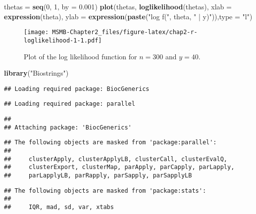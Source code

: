 \documentclass[]{article}
\newenvironment{Shaded}{\begin{snugshade}}{\end{snugshade}}
\newcommand{\KeywordTok}[1]{\textcolor[rgb]{0.13,0.29,0.53}{\textbf{#1}}}
\newcommand{\DataTypeTok}[1]{\textcolor[rgb]{0.13,0.29,0.53}{#1}}
\newcommand{\DecValTok}[1]{\textcolor[rgb]{0.00,0.00,0.81}{#1}}
\newcommand{\FloatTok}[1]{\textcolor[rgb]{0.00,0.00,0.81}{#1}}
\newcommand{\StringTok}[1]{\textcolor[rgb]{0.31,0.60,0.02}{#1}}
\newcommand{\NormalTok}[1]{#1}
\begin{document}
\begin{Shaded}
\begin{Highlighting}[]
\NormalTok{thetas =}\StringTok{ }\KeywordTok{seq}\NormalTok{(}\DecValTok{0}\NormalTok{, }\DecValTok{1}\NormalTok{, }\DataTypeTok{by =} \FloatTok{0.001}\NormalTok{)}
\KeywordTok{plot}\NormalTok{(thetas, }\KeywordTok{loglikelihood}\NormalTok{(thetas), }\DataTypeTok{xlab =} \KeywordTok{expression}\NormalTok{(theta),}
     \DataTypeTok{ylab =} \KeywordTok{expression}\NormalTok{(}\KeywordTok{paste}\NormalTok{(}\StringTok{"log f("}\NormalTok{, theta, }\StringTok{" | y)"}\NormalTok{)),}\DataTypeTok{type =} \StringTok{"l"}\NormalTok{)}
\end{Highlighting}
\end{Shaded}

\begin{figure}
\centering
\texttt{[image: MSMB-Chapter2\_files/figure-latex/chap2-r-loglikelihood-1-1.pdf]}
\caption{Plot of the log likelihood function for \(n=300\) and
\(y=40\).}
\end{figure}

\begin{Shaded}
\begin{Highlighting}[]
\KeywordTok{library}\NormalTok{(}\StringTok{"Biostrings"}\NormalTok{)}
\end{Highlighting}
\end{Shaded}

\begin{verbatim}
## Loading required package: BiocGenerics
\end{verbatim}

\begin{verbatim}
## Loading required package: parallel
\end{verbatim}

\begin{verbatim}
## 
## Attaching package: 'BiocGenerics'
\end{verbatim}

\begin{verbatim}
## The following objects are masked from 'package:parallel':
## 
##     clusterApply, clusterApplyLB, clusterCall, clusterEvalQ,
##     clusterExport, clusterMap, parApply, parCapply, parLapply,
##     parLapplyLB, parRapply, parSapply, parSapplyLB
\end{verbatim}

\begin{verbatim}
## The following objects are masked from 'package:stats':
## 
##     IQR, mad, sd, var, xtabs
\end{verbatim}
\end{document}
